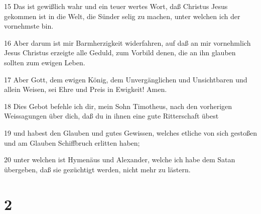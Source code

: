 \par 15 Das ist gewißlich wahr und ein teuer wertes Wort, daß Christus Jesus gekommen ist in die Welt, die Sünder selig zu machen, unter welchen ich der vornehmste bin.
\par 16 Aber darum ist mir Barmherzigkeit widerfahren, auf daß an mir vornehmlich Jesus Christus erzeigte alle Geduld, zum Vorbild denen, die an ihn glauben sollten zum ewigen Leben.
\par 17 Aber Gott, dem ewigen König, dem Unvergänglichen und Unsichtbaren und allein Weisen, sei Ehre und Preis in Ewigkeit! Amen.
\par 18 Dies Gebot befehle ich dir, mein Sohn Timotheus, nach den vorherigen Weissagungen über dich, daß du in ihnen eine gute Ritterschaft übest
\par 19 und habest den Glauben und gutes Gewissen, welches etliche von sich gestoßen und am Glauben Schiffbruch erlitten haben;
\par 20 unter welchen ist Hymenäus und Alexander, welche ich habe dem Satan übergeben, daß sie gezüchtigt werden, nicht mehr zu lästern.

\chapter{2}

